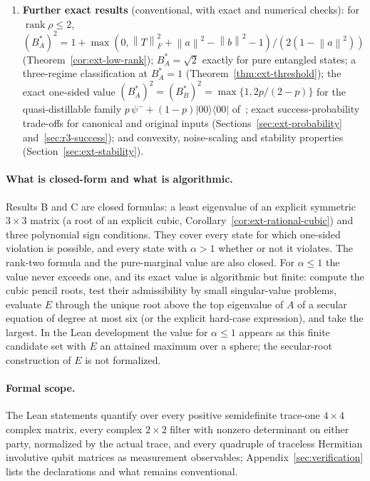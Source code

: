 \documentclass[11pt,a4paper]{article}
\theoremstyle{remark}\newtheorem{remark}[theorem]{Remark}
\DeclareMathOperator{\rank}{rank}\DeclareMathOperator{\ran}{ran}
\newcommand{\norm}[1]{\left\lVert#1\right\rVert}
\begin{document}
\begin{enumerate}[label=\textbf{\Alph*.},leftmargin=2em]
sphere; the explicit evaluation of $E$ by a secular equation and the
admissibility tests are conventional.
\item \textbf{Further exact results} (conventional, with exact and numerical
checks): for $\rank\rho\le2$,
$(B_A^*)^2=1+\max(0,\norm T_F^2+\norm a^2-\norm b^2-1)/(2(1-\norm a^2))$
(Theorem~\ref{cor:ext-low-rank}); $B_A^*=\sqrt2$ exactly for pure entangled
states; a three-regime classification at $B_A^*=1$
(Theorem~\ref{thm:ext-threshold}); the exact one-sided value
$(B_A^*)^2=(B_B^*)^2=\max\{1,2p/(2-p)\}$ for the quasi-distillable family
$p\,\psi^-+(1-p)|00\rangle\langle00|$ of~\cite{ducuara}; exact
success-probability trade-offs for canonical and original inputs
(Sections~\ref{sec:ext-probability} and~\ref{sec:r3-success}); and
convexity, noise-scaling and stability properties
(Section~\ref{sec:ext-stability}).
\end{enumerate}

\paragraph{What is closed-form and what is algorithmic.}
Results B and C are closed formulas: a least eigenvalue of an explicit
symmetric $3\times3$ matrix (a root of an explicit cubic,
Corollary~\ref{cor:ext-rational-cubic}) and three polynomial sign
conditions. They cover every state for which one-sided violation is
possible, and every state with $\alpha>1$ whether or not it violates. The
rank-two formula and the pure-marginal value are also closed. For
$\alpha\le1$ the value never exceeds one, and its exact value is
algorithmic but finite: compute the cubic pencil roots, test their
admissibility by small singular-value problems, evaluate $E$ through the
unique root above the top eigenvalue of $A$ of a secular equation of degree
at most six (or the explicit hard-case expression), and take the largest.
In the Lean development the value for $\alpha\le1$ appears as this finite
candidate set with $E$ an attained maximum over a sphere; the secular-root
construction of $E$ is not formalized.

\paragraph{Formal scope.}
The Lean statements quantify over every positive semidefinite trace-one
$4\times4$ complex matrix, every complex $2\times2$ filter with nonzero
determinant on either party, normalized by the actual trace, and every
quadruple of traceless Hermitian involutive qubit matrices as measurement
observables; Appendix~\ref{sec:verification} lists the declarations and
what remains conventional.
\end{document}
